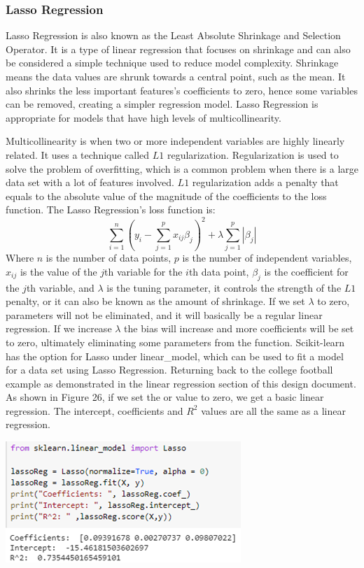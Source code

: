 \documentclass[a4paper,12pt]{report}
\begin{document}
\subsubsection{Lasso Regression}
Lasso Regression is also known as the Least Absolute Shrinkage and Selection Operator. It is a type of linear regression that focuses on shrinkage and can also be considered a simple technique used to reduce model complexity. Shrinkage means the data values are shrunk towards a central point, such as the mean. It also shrinks the less important features’s coefficients to zero, hence some variables can be removed, creating a simpler regression model. Lasso Regression is appropriate for models that have high levels of multicollinearity. 

Multicollinearity is when two or more independent variables are highly linearly related. It uses a technique called $L1$ regularization. Regularization is used to solve the problem of overfitting, which is a common problem when there is a large data set with a lot of features involved. $L1$ regularization adds a penalty that equals to the absolute value of the magnitude of the coefficients to the loss function. The Lasso Regression’s loss function is:
$$\sum_{i=1}^n\left(y_i-\sum_{j=1}^px_{ij}\beta_j\right)^2+\lambda\sum_{j=1}^p|\beta_j|$$
Where $n$ is the number of data points, $p$ is the number of independent variables, $x_{ij}$ is the value of the $j$th variable for the $i$th data point, $\beta_j$ is the coefficient for the $j$th variable, and $\lambda$ is the tuning parameter, it controls the strength of the $L1$ penalty, or it can also be known as the amount of shrinkage. If we set $\lambda$ to zero, parameters will not be eliminated, and it will basically be a regular linear regression. If we increase $\lambda$ the bias will increase and more coefficients will be set to zero, ultimately eliminating some parameters from the function. Scikit-learn has the option for Lasso under linear\_model, which can be used to fit a model for a data set using Lasso Regression. Returning back to the college football example as demonstrated in the linear regression section of this design document. As shown in Figure 26, if we set the or value to zero, we get a basic linear regression. The intercept, coefficients and $R^2$ values are all the same as a linear regression. 

\begin{center}
    \captionsetup{type=figure}
    \includegraphics[width=.9\linewidth]{media/lassocoeff.png}
\end{center}
\end{document}
